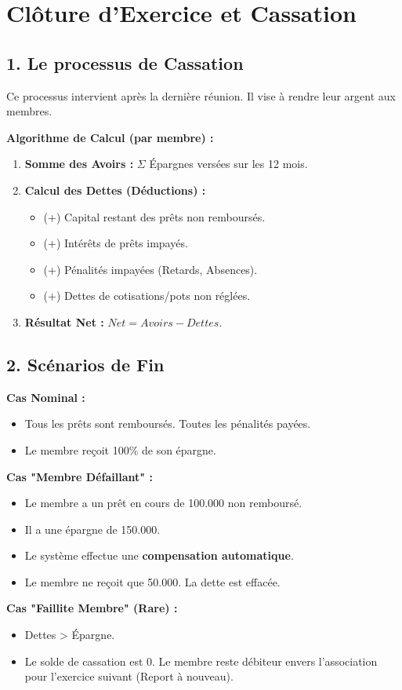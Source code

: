 \documentclass[12pt,a4paper]{report}
\begin{document}
\chapter{Clôture d'Exercice et Cassation}

\section{1. Le processus de Cassation}
Ce processus intervient après la dernière réunion. Il vise à rendre leur argent aux membres.

\textbf{Algorithme de Calcul (par membre) :}
\begin{enumerate}
    \item \textbf{Somme des Avoirs :} $\Sigma$ Épargnes versées sur les 12 mois.
    \item \textbf{Calcul des Dettes (Déductions) :}
    \begin{itemize}
        \item (+) Capital restant des prêts non remboursés.
        \item (+) Intérêts de prêts impayés.
        \item (+) Pénalités impayées (Retards, Absences).
        \item (+) Dettes de cotisations/pots non réglées.
    \end{itemize}
    \item \textbf{Résultat Net :} $Net = Avoirs - Dettes$.
\end{enumerate}

\section{2. Scénarios de Fin}
\textbf{Cas Nominal :}
\begin{itemize}
    \item Tous les prêts sont remboursés. Toutes les pénalités payées.
    \item Le membre reçoit 100\% de son épargne.
\end{itemize}

\textbf{Cas "Membre Défaillant" :}
\begin{itemize}
    \item Le membre a un prêt en cours de 100.000 non remboursé.
    \item Il a une épargne de 150.000.
    \item Le système effectue une \textbf{compensation automatique}.
    \item Le membre ne reçoit que 50.000. La dette est effacée.
\end{itemize}

\textbf{Cas "Faillite Membre" (Rare) :}
\begin{itemize}
    \item Dettes > Épargne.
    \item Le solde de cassation est 0. Le membre reste débiteur envers l'association pour l'exercice suivant (Report à nouveau).
\end{itemize}
\end{document}
